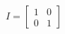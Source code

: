 \documentclass[preview]{standalone}
\begin{document}
\begin{align*}
I = \begin{bmatrix} 1 & 0 \\ 0 & 1 \end{bmatrix}
\end{align*}
\end{document}
